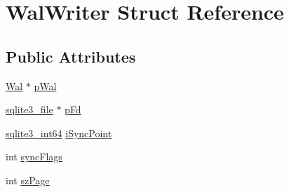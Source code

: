 \hypertarget{struct_wal_writer}{\section{Wal\-Writer Struct Reference}
\label{struct_wal_writer}
}
\subsection*{Public Attributes}
\begin{DoxyCompactItemize}
\item 
\hyperlink{struct_wal}{Wal} $\ast$ \hyperlink{struct_wal_writer_a3ed1cabab4a2f0572ec04d2a174e5bf9}{p\-Wal}
\item 
\hyperlink{structsqlite3__file}{sqlite3\-\_\-file} $\ast$ \hyperlink{struct_wal_writer_a0c98cddd084b97d9f531fa71b92ef40a}{p\-Fd}
\item 
\hyperlink{sqlite3_8c_a0a4d3e6c1ad46f90e746b920ab6ca0d2}{sqlite3\-\_\-int64} \hyperlink{struct_wal_writer_a1227aea1e12b6b409e8a7cdbae43588e}{i\-Sync\-Point}
\item 
int \hyperlink{struct_wal_writer_acc8dcbdc9b91bae4799b5de113742ae6}{sync\-Flags}
\item 
int \hyperlink{struct_wal_writer_aa161832c97830aed52410747ebde5e6e}{sz\-Page}
\end{DoxyCompactItemize}


